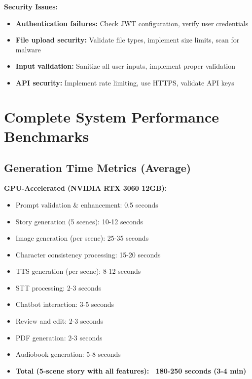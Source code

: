 {\textbf{Security Issues:}
\begin{itemize}
    \item \textbf{Authentication failures:} Check JWT configuration, verify user credentials
    \item \textbf{File upload security:} Validate file types, implement size limits, scan for malware
    \item \textbf{Input validation:} Sanitize all user inputs, implement proper validation
    \item \textbf{API security:} Implement rate limiting, use HTTPS, validate API keys
\end{itemize}

\section{Complete System Performance Benchmarks}

\subsection{Generation Time Metrics (Average)}

\textbf{GPU-Accelerated (NVIDIA RTX 3060 12GB):}
\begin{itemize}
    \item Prompt validation \& enhancement: 0.5 seconds
    \item Story generation (5 scenes): 10-12 seconds
    \item Image generation (per scene): 25-35 seconds
    \item Character consistency processing: 15-20 seconds
    \item TTS generation (per scene): 8-12 seconds
    \item STT processing: 2-3 seconds
    \item Chatbot interaction: 3-5 seconds
    \item Review and edit: 2-3 seconds
    \item PDF generation: 2-3 seconds
    \item Audiobook generation: 5-8 seconds
    \item \textbf{Total (5-scene story with all features): ~180-250 seconds (3-4 min)}
\end{itemize}

}

